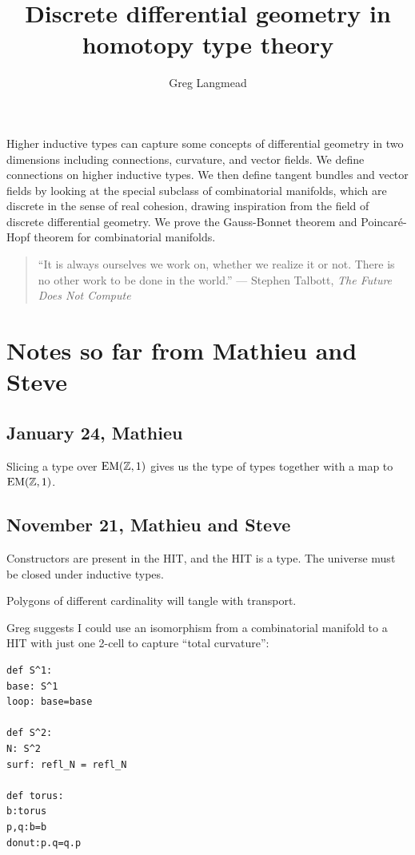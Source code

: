 \documentclass[12pt,fleqn]{article}
\title{Discrete differential geometry in homotopy type theory}
\author{Greg Langmead}
\renewenvironment{abstract}{\section*{\abstractname}}{}
\begin{document}
\maketitle

\begin{abstract}
Higher inductive types can capture some concepts of differential geometry in two dimensions including connections, curvature, and vector fields. We define connections on higher inductive types. We then define tangent bundles and vector fields by looking at the special subclass of combinatorial manifolds, which are discrete in the sense of real cohesion\cite{shulman_cohesion}, drawing inspiration from the field of discrete differential geometry. We prove the Gauss-Bonnet theorem and Poincaré-Hopf theorem for combinatorial manifolds.
\end{abstract}

\begin{quote} 
\centering
``It is always ourselves we work on, whether we realize it or not. There is no other work to be done in the world.'' --- Stephen Talbott, \emph{The Future Does Not Compute}\cite{talbott}
\end{quote}

\listofchanges[title=Changelist]

\section*{Notes so far from Mathieu and Steve}
\subsection{January 24, Mathieu}
Slicing a type over \( \mathrm{EM}(\mathbb{Z},1) \) gives us the type of types together with a map to \( \mathrm{EM}(\mathbb{Z},1) \).

\subsection{November 21, Mathieu and Steve}
Constructors are present in the HIT, and the HIT is a type. The universe must be closed under inductive types.

Polygons of different cardinality will tangle with transport.

Greg suggests I could use an isomorphism from a combinatorial manifold to a HIT with just one 2-cell to capture ``total curvature'':

\begin{verbatim}
def S^1:
base: S^1
loop: base=base

def S^2:
N: S^2
surf: refl_N = refl_N

def torus:
b:torus
p,q:b=b
donut:p.q=q.p
\end{verbatim}
\end{document}
